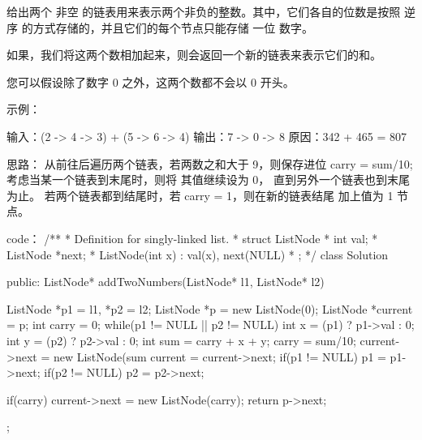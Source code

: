 给出两个 非空 的链表用来表示两个非负的整数。其中，它们各自的位数是按照 逆序 的方式存储的，并且它们的每个节点只能存储 一位 数字。

如果，我们将这两个数相加起来，则会返回一个新的链表来表示它们的和。

您可以假设除了数字 0 之外，这两个数都不会以 0 开头。

示例：

输入：(2 -> 4 -> 3) + (5 -> 6 -> 4)
输出：7 -> 0 -> 8
原因：342 + 465 = 807
































思路：
从前往后遍历两个链表，若两数之和大于 9，则保存进位 carry = sum/10;
考虑当某一个链表到末尾时，则将 其值继续设为 0， 直到另外一个链表也到末尾为止。
若两个链表都到结尾时，若 carry = 1，则在新的链表结尾 加上值为 1 节点。


























code：
/**
 * Definition for singly-linked list.
 * struct ListNode {
 *     int val;
 *     ListNode *next;
 *     ListNode(int x) : val(x), next(NULL) {}
 * };
 */
class Solution {
public:
    ListNode* addTwoNumbers(ListNode* l1, ListNode* l2) {
        ListNode *p1 = l1, *p2 = l2;
        ListNode *p = new ListNode(0);
        ListNode *current = p;
        int carry = 0;
        while(p1 != NULL || p2 != NULL)
        {
            int x = (p1) ? p1->val : 0;
            int y = (p2) ? p2->val : 0;
            int sum = carry + x + y;
            carry = sum/10;
            current->next = new ListNode(sum%
            current = current->next;
            if(p1 != NULL) p1 = p1->next;
            if(p2 != NULL) p2 = p2->next;
        }
        
        if(carry) current->next = new ListNode(carry);
        return p->next;
    }
};